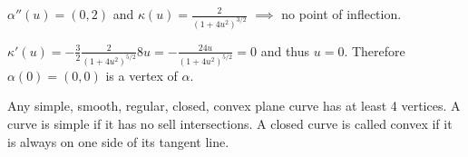 $\alpha''(u) = (0,2)$ and $\kappa (u) = \frac{2}{(1+4u^2)^{3/2}}$ $\implies$ no point of inflection.

$\kappa'(u) = - \frac{3}{2} \frac{2}{(1+4u^2)^{5/2}} 8u = - \frac{24 u}{(1+4u^2)^{5/2}} = 0$ and thus $u=0$. Therefore $\alpha(0) = (0,0)$ is a vertex of $\alpha$.


\vspace{\baselineskip}

Any simple, smooth, regular, closed, convex plane curve has at least 4 vertices. A curve is simple if it has no sell intersections. A closed curve is called convex if it is always on one side of its tangent line.